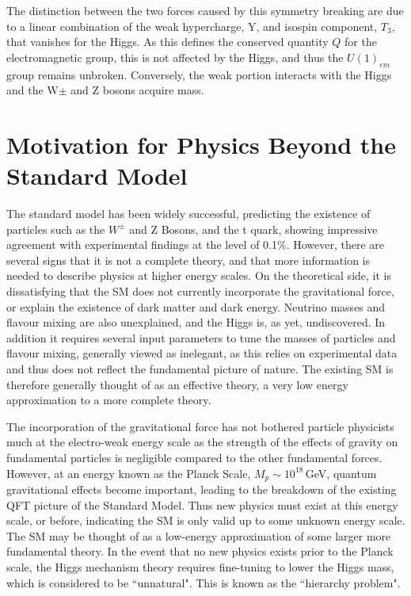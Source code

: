 The distinction between the two forces caused by this symmetry breaking are due to a linear combination of the weak hypercharge, Y, and isospin component, $T_{3}$, that vanishes for the Higgs. As this defines the conserved quantity $Q$ for the electromagnetic group, this is not affected by the Higgs, and thus the $U(1)_{em}$ group remains unbroken. Conversely, the weak portion interacts with the Higgs and the W$\pm$ and Z bosons acquire mass.  

\section{Motivation for Physics Beyond the Standard Model}
The standard model has been widely successful, predicting the existence of particles such as the $W^{\pm}$ and Z Bosons, and the t quark, showing impressive agreement with experimental findings at the level of 0.1\%. However, there are several signs that it is not a complete theory, and that more information is needed to describe physics at higher energy scales. On the theoretical side, it is dissatisfying that the SM does not currently incorporate the gravitational force, or explain the existence of dark matter and dark energy. Neutrino masses and flavour mixing are also unexplained, and the Higgs is, as yet, undiscovered. In addition it requires several input parameters to tune the masses of particles and flavour mixing, generally viewed as inelegant, as this relies on experimental data and thus does not reflect the fundamental picture of nature.  The existing SM is therefore generally thought of as an effective theory, a very low energy approximation to a more complete theory\cite{PeskinSch}.

The incorporation of the gravitational force has not bothered particle physicists much at the electro-weak energy scale as the strength of the effects of gravity on fundamental particles is negligible compared to the other fundamental forces. However, at an energy known as the Planck Scale, $M_{p} \sim 10^{18}$\,GeV, quantum gravitational effects become important, leading to the breakdown of the existing QFT picture of the Standard Model. Thus new physics must exist at this energy scale, or before, indicating the SM is only valid up to some unknown energy scale. The SM may be thought of as a low-energy approximation of some larger more fundamental theory. In the event that no new physics exists prior to the Planck scale, the Higgs mechanism theory requires fine-tuning to lower the Higgs mass, which is considered to be ``unnatural". This is known as the ``hierarchy problem".

